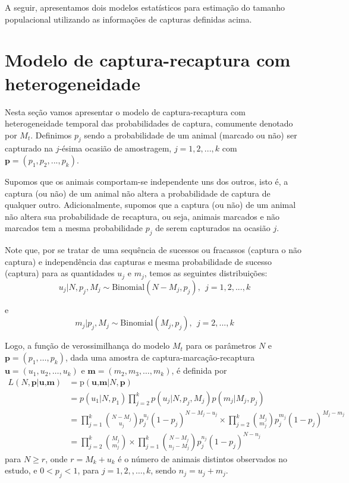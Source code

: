 \documentclass[
]{book}
\begin{document}
A seguir, apresentamos dois modelos estatísticos para estimação do tamanho populacional utilizando as informações de capturas definidas acima.

\hypertarget{modelo-de-captura-recaptura-com-heterogeneidade}{%
\section{\texorpdfstring{Modelo de captura-recaptura com heterogeneidade}{Modelo de captura-recaptura  com heterogeneidade}}\label{modelo-de-captura-recaptura-com-heterogeneidade}}

Nesta seção vamos apresentar o modelo de captura-recaptura com heterogeneidade temporal das probabilidades de captura, comumente denotado por \(M_t\). Definimos \(p_j\) sendo a probabilidade de um animal (marcado ou não) ser capturado na \(j\)-ésima ocasião de amostragem, \(j = 1 , 2, . . . ,k\) com \(\mathbf{p}= (p_1, p_2, . . . , p_k)\).

Supomos que os animais comportam-se independente uns dos outros, isto é, a captura (ou não) de
um animal não altera a probabilidade de captura de qualquer outro. Adicionalmente, supomos que a captura (ou não) de um animal não altera sua probabilidade de recaptura, ou seja, animais marcados e não marcados tem a mesma probabilidade \(p_j\) de serem capturados na ocasião \(j\).

Note que, por se tratar de uma sequência de sucessos ou fracassos (captura o não captura) e independência das capturas e mesma probabilidade de sucesso (captura) para as quantidades \(u_j\) e \(m_j\), temos as seguintes distribuições:
\begin{equation} 
u_j|N,p_j, M_j \sim \mathrm{Binomial}(N-M_j,p_j), ~~ j = 1,2,...,k  
\end{equation}

e
\begin{equation} 
m_j|p_j,M_j \sim \mathrm{Binomial}(M_j, p_j),   ~~   j = 2,...,k  
\end{equation}

Logo, a função de verossimilhança do modelo \(M_t\) para os parâmetros \(N\) e \(\mathbf{p} = (p_1,\ldots,p_k)\), dada uma amostra de captura-marcação-recaptura \(\mathbf{u}=(u_1,u_2,\ldots,u_k)\) e \(\mathbf{m} = (m_2,m_3,\ldots,m_k)\), é definida por
\begin{align*}
L(N,\textbf{p}|\textbf{u,m}) &= \mathrm{p}(\textbf{u,m}|N, \textbf{p})\\
 &= p(u_1|N,p_1)\prod^k_{j=2}p(u_j|N,p_j,M_j)p(m_j|M_j,p_j)\\
 &= \prod^k_{j=1}\binom{N-M_j}{u_j}p^{u_j}_j(1-p_j)^{N-M_j-u_j}\times \prod^k_{j=2}\binom{M_j}{m_j}p^{m_j}_j(1-p_j)^{M_j-m_j}\\
 &= \prod^k_{j=2}\binom{M_j}{m_j}\times \prod^k_{j=1}\binom{N-M_j}{n_j-M_j}p_j^{n_j}(1-p_j)^{N-n_j}
 \end{align*}
para \(N\geq r\), onde \(r = M_k+u_k\) é o número de animais distintos observados no estudo, e \(0<p_j<1\), para \(j=1,2,,\ldots,k\), sendo \(n_j = u_j+m_j\).
\end{document}
